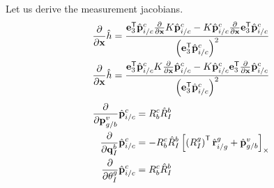 
Let us derive the measurement jacobians.
\begin{align}
  \frac{\partial}{\partial \x} \hat{h} &= \frac{\e_3^\transpose \hat{\vect{p}}_{i/c}^c
  \frac{\partial}{\partial \x} K \hat{\vect{p}}_{i/c}^c - K \hat{\vect{p}}_{i/c}^c
  \frac{\partial}{\partial \x} \e_3^\transpose \hat{\vect{p}}_{i/c}^c}{\left(
\e_3^\transpose \hat{\vect{p}}_{i/c}^c \right)^2 } \\
  \frac{\partial}{\partial \x} \hat{h} &= \frac{\e_3^\transpose \hat{\vect{p}}_{i/c}^c
  K \frac{\partial}{\partial \x} \hat{\vect{p}}_{i/c}^c - K \hat{\vect{p}}_{i/c}^c
  \e_3^\transpose \frac{\partial}{\partial \x} \hat{\vect{p}}_{i/c}^c}{\left(
\e_3^\transpose \hat{\vect{p}}_{i/c}^c \right)^2 }
\end{align}
\begin{align}
  \frac{\partial}{\partial \vect{p}_{g/b}^v} \hat{\vect{p}}_{i/c}^c &=
  R_b^c \hat{R}_I^b \\
  \frac{\partial}{\partial \vect{q}_{I}^b} \hat{\vect{p}}_{i/c}^c &=
  -R_b^c \hat{R}_I^b \skewmat{ \left( R_I^g \right)^\transpose
  \hat{\vect{r}}_{i/g}^g + \hat{\vect{p}}_{g/b}^v } \\
  \frac{\partial}{\partial \theta_I^g} \hat{\vect{p}}_{i/c}^c &=
  R_b^c \hat{R}_I^b \\
\end{align}

